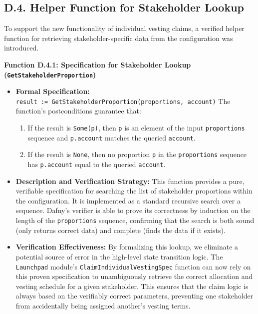 \documentclass[
  english,
  onecolumn]{article}
\providecommand{\tightlist}{%
  \setlength{\itemsep}{0pt}\setlength{\parskip}{0pt}}
\begin{document}
\subsection{D.4. Helper Function for Stakeholder
Lookup}\label{d.4.-helper-function-for-stakeholder-lookup}

To support the new functionality of individual vesting claims, a
verified helper function for retrieving stakeholder-specific data from
the configuration was introduced.

\textbf{Function D.4.1: Specification for Stakeholder Lookup
(\texttt{GetStakeholderProportion})}

\begin{itemize}
\tightlist
\item
  \textbf{Formal Specification:}
  \texttt{result\ :=\ GetStakeholderProportion(proportions,\ account)}
  The function's postconditions guarantee that:

  \begin{enumerate}
  \def\labelenumi{\arabic{enumi}.}
  \tightlist
  \item
    If the result is \texttt{Some(p)}, then \texttt{p} is an element of
    the input \texttt{proportions} sequence and \texttt{p.account}
    matches the queried \texttt{account}.
  \item
    If the result is \texttt{None}, then no proportion \texttt{p} in the
    \texttt{proportions} sequence has \texttt{p.account} equal to the
    queried \texttt{account}.
  \end{enumerate}
\item
  \textbf{Description and Verification Strategy:} This function provides
  a pure, verifiable specification for searching the list of stakeholder
  proportions within the configuration. It is implemented as a standard
  recursive search over a sequence. Dafny's verifier is able to prove
  its correctness by induction on the length of the \texttt{proportions}
  sequence, confirming that the search is both sound (only returns
  correct data) and complete (finds the data if it exists).
\item
  \textbf{Verification Effectiveness:} By formalizing this lookup, we
  eliminate a potential source of error in the high-level state
  transition logic. The \texttt{Launchpad} module's
  \texttt{ClaimIndividualVestingSpec} function can now rely on this
  proven specification to unambiguously retrieve the correct allocation
  and vesting schedule for a given stakeholder. This ensures that the
  claim logic is always based on the verifiably correct parameters,
  preventing one stakeholder from accidentally being assigned another's
  vesting terms.
\end{itemize}
\end{document}
